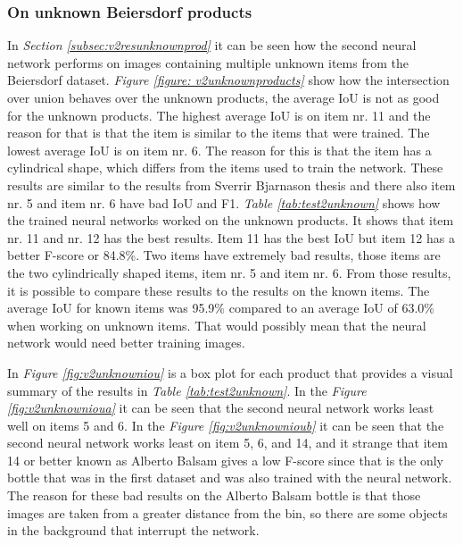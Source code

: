 \subsubsection{On unknown Beiersdorf products}
In \textit{Section \ref{subsec:v2resunknownprod}} it can be seen how the second neural network performs on images containing multiple unknown items from the Beiersdorf dataset. \textit{Figure \ref{figure: v2unknownproducts}} show how the intersection over union behaves over the unknown products, the average IoU is not as good for the unknown products. The highest average IoU is on item nr. 11 and the reason for that is that the item is similar to the items that were trained. The lowest average IoU is on item nr. 6. The reason for this is that the item has a cylindrical shape, which differs from the items used to train the network. These results are similar to the results from Sverrir Bjarnason thesis\cite{bjarnason_detecting_2021} and there also item nr. 5 and item nr. 6 have bad IoU and F1.
\textit{Table \ref{tab:test2unknown}} shows how the trained neural networks worked on the unknown products. It shows that item nr. 11 and nr. 12 has the best results. Item 11 has the best IoU but item 12 has a better F-score or 84.8\%. Two items have extremely bad results, those items are the two cylindrically shaped items, item nr. 5 and item nr. 6. From those results, it is possible to compare these results to the results on the known items. The average IoU for known items was 95.9\% compared to an average IoU of 63.0\% when working on unknown items. That would possibly mean that the neural network would need better training images. 

In \textit{Figure \ref{fig:v2unknowniou}} is a box plot for each product that provides a visual summary of the results in \textit{Table \ref{tab:test2unknown}}. In the \textit{Figure \ref{fig:v2unknownioua}} it can be seen that the second neural network works least well on items 5 and 6. In the \textit{Figure \ref{fig:v2unknownioub}} it can be seen that the second neural network works least on item 5, 6, and 14, and it strange that item 14 or better known as Alberto Balsam gives a low F-score since that is the only bottle that was in the first dataset and was also trained with the neural network. The reason for these bad results on the Alberto Balsam bottle is that those images are taken from a greater distance from the bin, so there are some objects in the background that interrupt the network. 

